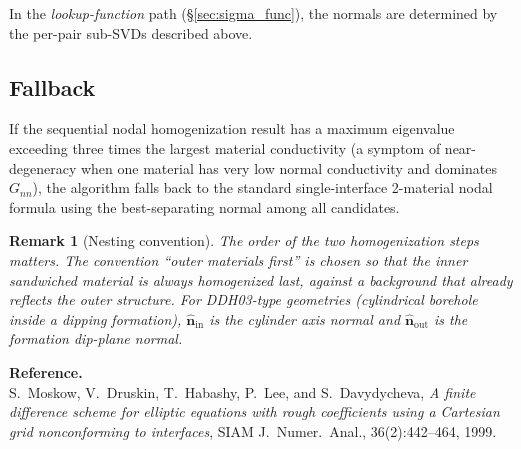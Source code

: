 \documentclass[11pt]{article}
\newtheorem{remark}{Remark}
\newcommand{\nn}{\hat{\bm{n}}}
\begin{document}
In the \emph{lookup-function} path (\S\ref{sec:sigma_func}), the normals are
determined by the per-pair sub-SVDs described above.

\subsection*{Fallback}

If the sequential nodal homogenization result has a maximum eigenvalue exceeding three times
the largest material conductivity (a symptom of near-degeneracy when one material
has very low normal conductivity and dominates $G_{nn}$), the algorithm falls
back to the standard single-interface 2-material nodal formula using the
best-separating normal among all candidates.

\begin{remark}[Nesting convention]
The order of the two homogenization steps matters.  The convention ``outer materials
first'' is chosen so that the inner sandwiched material is always
homogenized last, against a background that already reflects the outer
structure.  For DDH03-type geometries (cylindrical borehole inside a dipping
formation), $\nn_\mathrm{in}$ is the cylinder axis normal and
$\nn_\mathrm{out}$ is the formation dip-plane normal.
\end{remark}

\bigskip
\noindent\textbf{Reference.}\\
S.\ Moskow, V.\ Druskin, T.\ Habashy, P.\ Lee, and S.\ Davydycheva,
\emph{A finite difference scheme for elliptic equations with rough coefficients
using a Cartesian grid nonconforming to interfaces},
SIAM J.\ Numer.\ Anal., 36(2):442--464, 1999.
\end{document}
